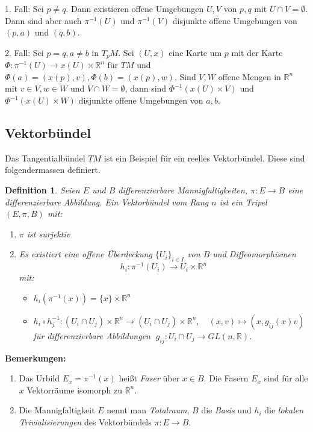 \documentclass[12pt,a4paper]{article}
\def\R{\mathbb{R}}
\newtheorem{Definition}[Lemma]{Definition}
\begin{document}
\medskip

1. Fall: Sei $p\neq q$. Dann existieren offene Umgebungen $U, V$ von $p,q$ mit $U\cap V= \emptyset$. Dann sind aber
auch $\pi^{-1}(U)$ und  $\pi^{-1}(V)$ disjunkte offene Umgebungen von $(p,a)$ und $(q,b)$.

\medskip

2. Fall: Sei $p=q, a\neq b$ in $T_pM$. Sei $(U,x)$ eine Karte um $p$ mit der Karte
$\Phi: \pi^{-1}(U)\rightarrow x(U)\times \R^n$ f\"ur $TM$ und $\Phi(a)=(x(p),v), \Phi(b)=(x(p),w)$.
Sind $V,W$ offene Mengen in $\R^n$ mit $v\in V, w\in W$ und $V\cap W = \emptyset$, dann sind
$\Phi^{-1}(x(U)\times V)$ und $\Phi^{-1}(x(U)\times W)$ disjunkte offene Umgebungen von $a,b$.


\subsection{Vektorb\"undel}

Das Tangentialb\"undel $TM$ ist ein Beispiel f\"ur ein reelles Vektorb\"undel. Diese sind
folgendermassen definiert.

\begin{Definition}
Seien $E$ und $B$ differenzierbare Mannigfaltigkeiten, $\pi:E\rightarrow B$ eine
differenzierbare Abbildung. Ein {\em Vektorb\"undel} vom Rang $n$ ist ein Tripel
$(E,\pi,B)$ mit:
\begin{enumerate}
\item
$\pi$ ist surjektiv
\item
Es existiert eine offene \"Uberdeckung $\{U_i\}_{i\in I}$ von $B$ und Diffeomorphismen
$$
h_i : \pi^{-1}(U_i) \rightarrow U_i \times \R^n
$$
mit:
\begin{itemize}
\item
$h_i(\pi^{-1}(x)) = \{x\} \times \R^n $
\item
$ h_i \circ h_j^{-1} : (U_i \cap U_j) \times \R^n \rightarrow (U_i \cap U_j) \times \R^n, \quad (x,v) \mapsto (x,g_{ij}(x)v)$
\newline f\"ur differenzierbare Abbildungen $\; g_{ij}: U_i\cap U_j \rightarrow GL(n,\R)$.
\end{itemize}
\end{enumerate}
\end{Definition}

\medskip

{\bf Bemerkungen:}
\begin{enumerate}
\item
Das Urbild $E_x=\pi^{-1}(x)$ hei\ss t {\it Faser} \"uber $x\in B$. Die Fasern $E_x$ sind f\"ur alle $x$
Vektorr\"aume isomorph zu $\R^n$.
\item
Die Mannigfaltigkeit $E$ nennt man {\it Totalraum}, $B$ die {\it Basis} und $h_i$ die {\it
lokalen Trivialisierungen} des Vektorb\"undels $\pi:E\rightarrow B$.
\end{enumerate}
\end{document}

